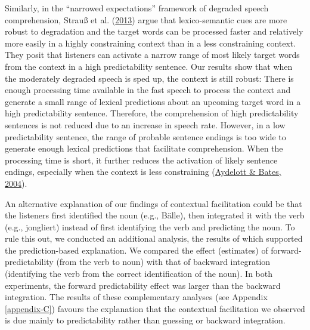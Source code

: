 \documentclass[a4paper, nobind]{templates/ociamthesis}
\begin{document}
Similarly, in the ``narrowed expectations'' framework of degraded speech comprehension, Strauß et al. (\protect\hyperlink{ref-Strauss2013}{2013}) argue that lexico-semantic cues are more robust to degradation and the target words can be processed faster and relatively more easily in a highly constraining context than in a less constraining context.
They posit that listeners can activate a narrow range of most likely target words from the context in a high predictability sentence.
Our results show that when the moderately degraded speech is sped up, the context is still robust:
There is enough processing time available in the fast speech to process the context and generate a small range of lexical predictions about an upcoming target word in a high predictability sentence.
Therefore, the comprehension of high predictability sentences is not reduced due to an increase in speech rate.
However, in a low predictability sentence, the range of probable sentence endings is too wide to generate enough lexical predictions that facilitate comprehension.
When the processing time is short, it further reduces the activation of likely sentence endings, especially when the context is less constraining (\protect\hyperlink{ref-Aydelott2004}{Aydelott \& Bates, 2004}).

An alternative explanation of our findings of contextual facilitation could be that the listeners first identified the noun (e.g., Bälle), then integrated it with the verb (e.g., jongliert) instead of first identifying the verb and predicting the noun.
To rule this out, we conducted an additional analysis, the results of which supported the prediction-based explanation.
We compared the effect (estimates) of forward-predictability (from the verb to noun) with that of backward integration (identifying the verb from the correct identification of the noun).
In both experiments, the forward predictability effect was larger than the backward integration.
The results of these complementary analyses (see Appendix \ref{appendix-C}) favours the explanation that the contextual facilitation we observed is due mainly to predictability rather than guessing or backward integration.
\end{document}
